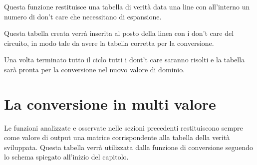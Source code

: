 \documentclass[
]{book}
\begin{document}
Questa funzione restituisce una tabella di verità data una line con all'interno un numero di don't care che necessitano di espansione.

Questa tabella creata verrà inserita al posto della linea con i don't care del circuito, in modo tale da avere la tabella corretta per la conversione.

Una volta terminato tutto il ciclo tutti i dont't care saranno risolti e la tabella sarà pronta per la conversione nel nuovo valore di dominio.

\newpage

\hypertarget{la-conversione-in-multi-valore}{%
\section{La conversione in multi valore}\label{la-conversione-in-multi-valore}}

Le funzioni analizzate e osservate nelle sezioni precedenti restituiscono sempre come valore di output una matrice corrispondente alla tabella della verità sviluppata. Questa tabella verrà utilizzata dalla funzione di conversione seguendo lo schema spiegato all'inizio del capitolo.
\end{document}
